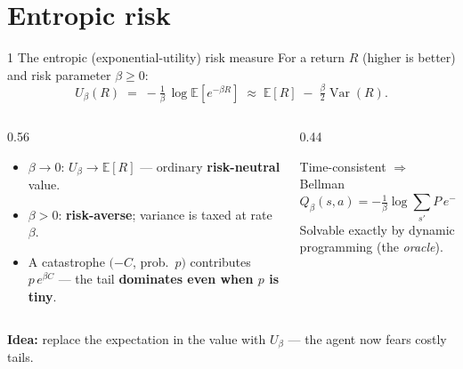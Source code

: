 \documentclass[aspectratio=169,11pt]{beamer}
\newcommand{\Ub}{U_{\beta}}
\newcommand{\E}{\mathbb{E}}
\begin{document}
\section{Entropic risk}
\begin{frame}{1 \quad The entropic (exponential-utility) risk measure}
  For a return $R$ (higher is better) and risk parameter $\beta\ge 0$:
  \[
     \Ub(R) \;=\; -\tfrac{1}{\beta}\,\log \E\!\left[e^{-\beta R}\right]
     \;\approx\; \E[R] \;-\; \tfrac{\beta}{2}\operatorname{Var}(R).
  \]
  \begin{columns}
  \begin{column}{0.56\textwidth}
  \begin{itemize}
    \item $\beta \to 0$: $\Ub \to \E[R]$ --- ordinary \textbf{risk-neutral} value.
    \item $\beta > 0$: \textbf{risk-averse}; variance is taxed at rate $\beta$.
    \item A catastrophe $(-C$, prob.\ $p)$ contributes $p\,e^{\beta C}$ ---
          the tail \textbf{dominates even when $p$ is tiny}.
  \end{itemize}
  \end{column}
  \begin{column}{0.44\textwidth}
  \begin{block}{Time-consistent $\Rightarrow$ Bellman}
  \footnotesize
  \[
    Q_\beta(s,a)= -\tfrac1\beta\log\!\sum_{s'}\! P\,e^{-\beta[R+V(s')]}
  \]
  Solvable exactly by dynamic programming (the \emph{oracle}).
  \end{block}
  \end{column}
  \end{columns}
  \vspace{2mm}
  \begin{center}\small
  \textbf{Idea:} replace the expectation in the value with $\Ub$ --- the agent now fears costly tails.
  \end{center}
\end{frame}

\end{document}
